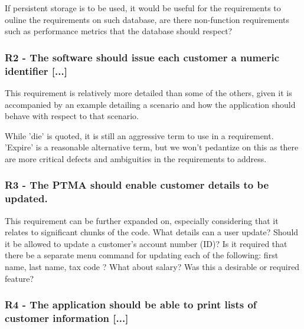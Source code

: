If persistent storage is to be used, it would be useful for the requirements to ouline the requirements on such database, are there non-function requirements such as performance metrics that the database should respect? 

\subsubsection{R2 - The software should issue each customer a numeric identifier [...]} %

This requirement is relatively more detailed than some of the others, given it is accompanied by an example detailing a scenario and how the application should behave with respect to that scenario. 

While 'die' is quoted, it is still an aggressive term to use in a requirement. 'Expire' is a reasonable alternative term, but we won't pedantize on this as there are more critical defects and ambiguities in the requirements to address.

\subsubsection{R3 - The PTMA should enable customer details to be updated.}

This requirement can be further expanded on, especially considering that it relates to significant chunks of the code. 
What details can a user update? Should it be allowed to update a customer's account number (ID)?
Is it required that there be a separate menu command for updating each of the following: first name, last name, tax code ? What about salary? Was this a desirable or required feature?    


\subsubsection{R4 - The application should be able to print lists of customer information [...]} %

